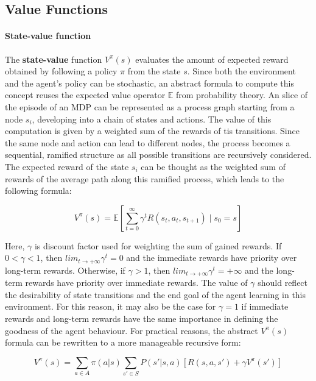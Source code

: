 \subsection{Value Functions}

\paragraph{State-value function}
\label{par:state-value-function}

The \textbf{state-value} function $V^{\pi}(s)$ evaluates the amount of expected reward obtained by following a policy $\pi$ from the state $s$.
Since both the environment and the agent's policy can be stochastic, an abstract formula to compute this concept reuses the expected value operator $\mathbb{E}$ from probability theory.
An slice of the episode of an MDP can be represented as a process graph starting from a node $s_i$, developing into a chain of states and actions. The value of this computation is given by a weighted sum of the rewards of tis transitions.
Since the same node and action can lead to different nodes, the process becomes a sequential, ramified structure as all possible transitions are recursively considered.
The expected reward of the state $s_i$ can be thought as the weighted sum of rewards of the average path along this ramified process, which leads to the following formula:

\begin{equation} \label{eq:v-pi-E}
V^\pi(s) = \mathbb{E} \left[ \sum_{t=0}^{\infty} \gamma^t R(s_t, a_t, s_{t + 1}) \mid s_0 = s \right]
\end{equation}

Here, \textbf{$\gamma$} is discount factor used for weighting the sum of gained rewards. If $0 < \gamma < 1$, then $lim _ {t \rightarrow +\infty} \gamma ^ t = 0$ and the immediate rewards have priority over long-term rewards. Otherwise, if $\gamma > 1$, then $lim _ {t \rightarrow +\infty} \gamma ^ t = +\infty$ and the long-term rewards have priority over immediate rewards. The value of $\gamma$ should reflect the desirability of state transitions and the end goal of the agent learning in this environment. For this reason, it may also be the case for $\gamma = 1$ if immediate rewards and long-term rewards have the same importance in defining the goodness of the agent behaviour. For practical reasons, the abstract $V^{\pi}(s)$ formula can be rewritten to a more manageable recursive form:

\begin{equation} \label{eq:v-pi-bellman}
V^{\pi}(s) = \sum _ {a \in A} \pi (a | s) \sum _ {s' \in S} P(s' | s, a) \left[ R(s, a, s') + \gamma V^{\pi}(s') \right]
\end{equation}


